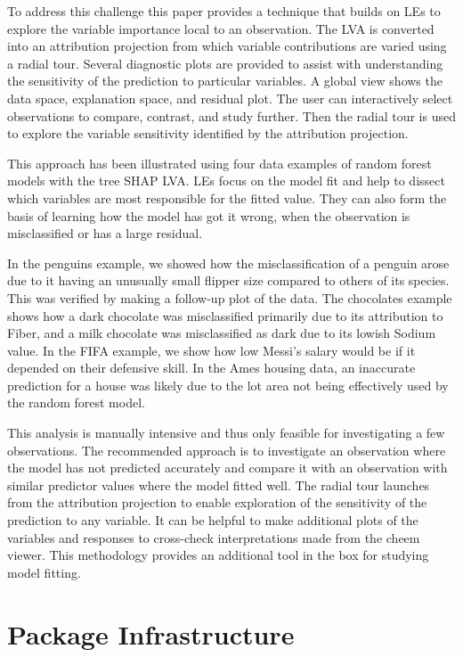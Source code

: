 \documentclass[
]{jss}
\begin{document}
To address this challenge this paper provides a technique that builds on
LEs to explore the variable importance local to an observation. The LVA
is converted into an attribution projection from which variable
contributions are varied using a radial tour. Several diagnostic plots
are provided to assist with understanding the sensitivity of the
prediction to particular variables. A global view shows the data space,
explanation space, and residual plot. The user can interactively select
observations to compare, contrast, and study further. Then the radial
tour is used to explore the variable sensitivity identified by the
attribution projection.

This approach has been illustrated using four data examples of random
forest models with the tree SHAP LVA. LEs focus on the model fit and
help to dissect which variables are most responsible for the fitted
value. They can also form the basis of learning how the model has got it
wrong, when the observation is misclassified or has a large residual.

In the penguins example, we showed how the misclassification of a
penguin arose due to it having an unusually small flipper size compared
to others of its species. This was verified by making a follow-up plot
of the data. The chocolates example shows how a dark chocolate was
misclassified primarily due to its attribution to Fiber, and a milk
chocolate was misclassified as dark due to its lowish Sodium value. In
the FIFA example, we show how low Messi's salary would be if it depended
on their defensive skill. In the Ames housing data, an inaccurate
prediction for a house was likely due to the lot area not being
effectively used by the random forest model.

This analysis is manually intensive and thus only feasible for
investigating a few observations. The recommended approach is to
investigate an observation where the model has not predicted accurately
and compare it with an observation with similar predictor values where
the model fitted well. The radial tour launches from the attribution
projection to enable exploration of the sensitivity of the prediction to
any variable. It can be helpful to make additional plots of the
variables and responses to cross-check interpretations made from the
cheem viewer. This methodology provides an additional tool in the box
for studying model fitting.

\hypertarget{sec:infrastructure}{%
\section{Package Infrastructure}\label{sec:infrastructure}}
\end{document}
